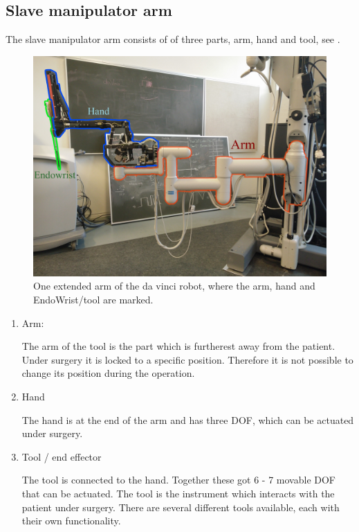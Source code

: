 

\subsection*{Slave manipulator arm}
The slave manipulator arm consists of of three parts, arm, hand and tool, see .

\begin{figure}[H]
	\centering
		\centering
		\includegraphics[width=0.85\linewidth]{davincirobotarm_label.jpg}
		\caption{One extended arm of the da vinci robot, where the arm, hand and EndoWrist/tool are marked.}
		\label{fig:davinciarmrobot}
\end{figure}


\begin{enumerate}
\item Arm:

The arm of the tool is the part which is furtherest away from the patient. 
Under surgery it is locked to a specific position. Therefore it is not possible to change its position during the operation.
\item Hand

The hand is at the end of the arm and has three \gls{DOF}, which can be actuated under surgery.
\item Tool / end effector 

The tool is connected to the hand. Together these got 6 - 7 movable \gls{DOF} that can be actuated. The tool is the instrument which interacts with the patient under surgery. There are several different tools available, each with their own functionality. 
\end{enumerate}

